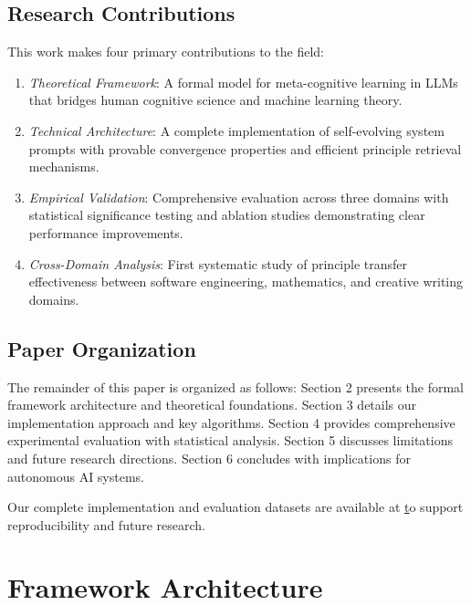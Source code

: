 \documentclass[10pt,a4paper,twocolumn]{article}
\begin{document}
\subsection{Research Contributions}

This work makes four primary contributions to the field:

\begin{enumerate}
\item \textit{Theoretical Framework}: A formal model for meta-cognitive learning in LLMs that bridges human cognitive science and machine learning theory.

\item \textit{Technical Architecture}: A complete implementation of self-evolving system prompts with provable convergence properties and efficient principle retrieval mechanisms.

\item \textit{Empirical Validation}: Comprehensive evaluation across three domains with statistical significance testing and ablation studies demonstrating clear performance improvements.

\item \textit{Cross-Domain Analysis}: First systematic study of principle transfer effectiveness between software engineering, mathematics, and creative writing domains.
\end{enumerate}


\subsection{Paper Organization}

The remainder of this paper is organized as follows: Section 2 presents the formal framework architecture and theoretical foundations. Section 3 details our implementation approach and key algorithms. Section 4 provides comprehensive experimental evaluation with statistical analysis. Section 5 discusses limitations and future research directions. Section 6 concludes with implications for autonomous AI systems.

Our complete implementation and evaluation datasets are available at \href{https://github.com/yarenty/prompt\_learning} to support reproducibility and future research.





\section{{Framework Architecture} }
\end{document}
